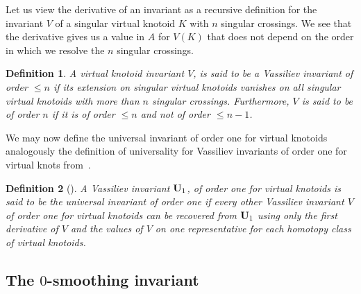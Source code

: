 \documentclass[11pt]{amsart}
\theoremstyle{noparens}
\newtheorem{definition}{Definition}[section]
\numberwithin{equation}{section}
\numberwithin{equation}{section}
\begin{document}
Let us view the derivative of an invariant as a recursive definition for the invariant $V$ of a singular virtual knotoid $K$ with $n$ singular crossings. We see that the derivative gives us a value in $A$ for $V(K)$ that does not depend on the order in which we resolve the $n$ singular crossings.

\begin{definition} {\rm 
A virtual knotoid invariant $V$, is said to be a \textit{Vassiliev invariant of order $\leq n$} if its extension on singular virtual knotoids vanishes on all singular virtual knotoids with more than $n$ singular crossings. Furthermore, $V$ is said to be of order $n$ if it is of order $\leq n$ and not of order $\leq n-1$.
}
\end{definition}

We may now define the universal invariant of order one for virtual knotoids analogously the definition of universality for Vassiliev invariants of order one for virtual knots from~\cite{Hen}.

\begin{definition} [\cite{Hen}]  {\rm 
A Vassiliev invariant $\bold{U}_1$, of order one for virtual knotoids is said to be the \textit{universal invariant of order one} if every other Vassiliev invariant $V$ of order one for virtual knotoids can be recovered from $\bold{U}_1$ using only the first derivative of $V$ and the values of $V$ on one representative for each homotopy class of virtual knotoids.} 
\end{definition}

\subsection{The $0$-smoothing invariant} 
\end{document}
